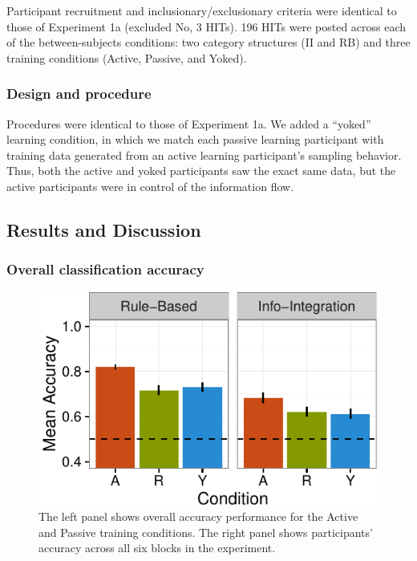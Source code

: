 \documentclass[10pt, letterpaper]{article}
\newenvironment{CodeChunk}{}{}
\begin{document}
Participant recruitment and inclusionary/exclusionary criteria were
identical to those of Experiment 1a (excluded No, 3 HITs). 196 HITs were
posted across each of the between-subjects conditions: two category
structures (II and RB) and three training conditions (Active, Passive,
and Yoked).

\subsubsection{Design and procedure}\label{design-and-procedure-1}

Procedures were identical to those of Experiment 1a. We added a
``yoked'' learning condition, in which we match each passive learning
participant with training data generated from an active learning
participant's sampling behavior. Thus, both the active and yoked
participants saw the exact same data, but the active participants were
in control of the information flow.

\subsection{Results and Discussion}\label{results-and-discussion-1}

\subsubsection{Overall classification
accuracy}\label{overall-classification-accuracy-1}

\begin{CodeChunk}
\captionsetup{width=0.8\columnwidth}\begin{figure}[t]

{\centering \includegraphics{figs/rep1b-acc-plot-1} 

}

\caption[The left panel shows overall accuracy performance for the Active and Passive training conditions]{The left panel shows overall accuracy performance for the Active and Passive training conditions. The right panel shows participants' accuracy across all six blocks in the experiment.}\label{fig:rep1b-acc-plot}
\end{figure}
\end{CodeChunk}
\end{document}
